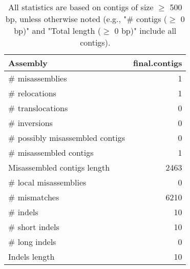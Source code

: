 \documentclass[12pt,a4paper]{article}
\begin{document}
\begin{table}[ht]
\begin{center}
\caption{All statistics are based on contigs of size $\geq$ 500 bp, unless otherwise noted (e.g., "\# contigs ($\geq$ 0 bp)" and "Total length ($\geq$ 0 bp)" include all contigs).}
\begin{tabular}{|l*{1}{|r}|}
\hline
Assembly & final.contigs \\ \hline
\# misassemblies & 1 \\ \hline
\hspace{5mm}\# relocations & 1 \\ \hline
\hspace{5mm}\# translocations & 0 \\ \hline
\hspace{5mm}\# inversions & 0 \\ \hline
\# possibly misassembled contigs & 0 \\ \hline
\# misassembled contigs & 1 \\ \hline
Misassembled contigs length & 2463 \\ \hline
\# local misassemblies & 0 \\ \hline
\# mismatches & 6210 \\ \hline
\# indels & 10 \\ \hline
\hspace{5mm}\# short indels & 10 \\ \hline
\hspace{5mm}\# long indels & 0 \\ \hline
Indels length & 10 \\ \hline
\end{tabular}
\end{center}
\end{table}
\end{document}
